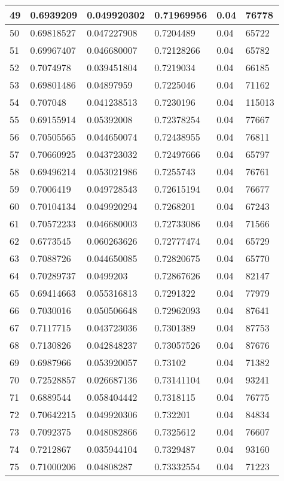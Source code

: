 \begin{longtable}{|l|l|l|l|l|l|}
49 & 0.6939209 & 0.049920302 & 0.71969956 & 0.04 & 76778 \\ \hline 
50 & 0.69818527 & 0.047227908 & 0.7204489 & 0.04 & 65722 \\ \hline 
51 & 0.69967407 & 0.046680007 & 0.72128266 & 0.04 & 65782 \\ \hline 
52 & 0.7074978 & 0.039451804 & 0.7219034 & 0.04 & 66185 \\ \hline 
53 & 0.69801486 & 0.04897959 & 0.7225046 & 0.04 & 71162 \\ \hline 
54 & 0.707048 & 0.041238513 & 0.7230196 & 0.04 & 115013 \\ \hline 
55 & 0.69155914 & 0.05392008 & 0.72378254 & 0.04 & 77667 \\ \hline 
56 & 0.70505565 & 0.044650074 & 0.72438955 & 0.04 & 76811 \\ \hline 
57 & 0.70660925 & 0.043723032 & 0.72497666 & 0.04 & 65797 \\ \hline 
58 & 0.69496214 & 0.053021986 & 0.7255743 & 0.04 & 76761 \\ \hline 
59 & 0.7006419 & 0.049728543 & 0.72615194 & 0.04 & 76677 \\ \hline 
60 & 0.70104134 & 0.049920294 & 0.7268201 & 0.04 & 67243 \\ \hline 
61 & 0.70572233 & 0.046680003 & 0.72733086 & 0.04 & 71566 \\ \hline 
62 & 0.6773545 & 0.060263626 & 0.72777474 & 0.04 & 65729 \\ \hline 
63 & 0.7088726 & 0.044650085 & 0.72820675 & 0.04 & 65770 \\ \hline 
64 & 0.70289737 & 0.0499203 & 0.72867626 & 0.04 & 82147 \\ \hline 
65 & 0.69414663 & 0.055316813 & 0.7291322 & 0.04 & 77979 \\ \hline 
66 & 0.7030016 & 0.050506648 & 0.72962093 & 0.04 & 87641 \\ \hline 
67 & 0.7117715 & 0.043723036 & 0.7301389 & 0.04 & 87753 \\ \hline 
68 & 0.7130826 & 0.042848237 & 0.73057526 & 0.04 & 87676 \\ \hline 
69 & 0.6987966 & 0.053920057 & 0.73102 & 0.04 & 71382 \\ \hline 
70 & 0.72528857 & 0.026687136 & 0.73141104 & 0.04 & 93241 \\ \hline 
71 & 0.6889544 & 0.058404442 & 0.7318115 & 0.04 & 76775 \\ \hline 
72 & 0.70642215 & 0.049920306 & 0.732201 & 0.04 & 84834 \\ \hline 
73 & 0.7092375 & 0.048082866 & 0.7325612 & 0.04 & 76607 \\ \hline 
74 & 0.7212867 & 0.035944104 & 0.7329487 & 0.04 & 93160 \\ \hline 
75 & 0.71000206 & 0.04808287 & 0.73332554 & 0.04 & 71223 \\ \hline 
\end{longtable}